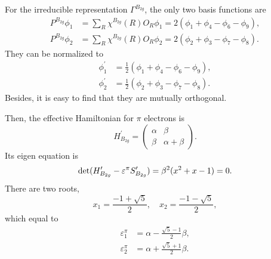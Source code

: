 		For the irreducible representation $\Gamma^{B_{2g}}$, the only two basis functions are
		\begin{align*}
			P^{B_{2g}}\phi_1 &= \sum_{R} \chi^{B_{2g}}(R) O_R \phi_1 = 2(\phi_1 + \phi_4 - \phi_6 - \phi_9 ), \\
			P^{B_{2g}}\phi_2 &= \sum_{R} \chi^{B_{2g}}(R) O_R \phi_2 = 2(\phi_2 + \phi_3 - \phi_7 - \phi_8 ).	
		\end{align*}
		They can be normalized to
		\begin{align*}
			\phi^\prime_1 &= \frac{1}{2}(\phi_1 + \phi_4 - \phi_6 - \phi_9), \\
			\phi^\prime_2 &= \frac{1}{2}(\phi_2 + \phi_3 - \phi_7 - \phi_8).
		\end{align*}
		Besides, it is easy to find that they are mutually orthogonal.
		
		Then, the effective Hamiltonian for $\pi$ electrons is
		\begin{equation*}
			H^\prime_{B_{2g}} = \begin{pmatrix}
				\alpha	&	\beta	\\
				\beta	&	\alpha+\beta
				\end{pmatrix}.				
		\end{equation*}
		Its eigen equation is		
		\begin{equation}
			\det(H^\prime_{B_{2g}}-\varepsilon^\pi S^\prime_{B_{2g}}) = \beta^2 ( x^2 + x - 1 ) = 0.
		\end{equation}
		There are two roots,
		\begin{equation}
			x_1 = \frac{-1+\sqrt{5}}{2}, \quad x_2 = \frac{-1-\sqrt{5}}{2},
		\end{equation}
		which equal to
		\begin{align}
			\varepsilon^\pi_1 &= \alpha - \frac{\sqrt{5}-1}{2}\beta, \\
			\varepsilon^\pi_2 &= \alpha + \frac{\sqrt{5}+1}{2}\beta.
		\end{align}
		
